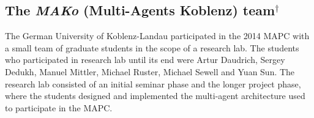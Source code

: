 \subsection{The \emph{MAKo} (Multi-Agents Koblenz) team$^\dagger$}
The German University of Koblenz-Landau participated in the 2014 MAPC with a small team of graduate students in the scope of a research lab.
The students who participated in research lab until its end were Artur Daudrich, Sergey Dedukh, Manuel Mittler, Michael Ruster, Michael Sewell and Yuan Sun.
The research lab consisted of an initial seminar phase and the longer project phase, where the students designed and implemented the multi-agent architecture used to participate in the MAPC.